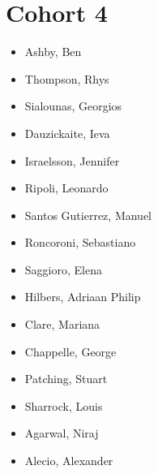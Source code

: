 \documentclass{article}
\begin{document}
\section*{Cohort 4}
\begin{itemize}
    \item Ashby, Ben \cite{ashby2021adaptive}
    \item Thompson, Rhys \cite{thompson2020accounting, thompsonpro, bloch2021constraining,bloch2021constraining}
    \item Sialounas, Georgios
    \item Dauzickaite, Ieva \cite{dauvzickaite2020spectral,dauvzickaite2021randomised,dauvzickaite2021time} %
    \item Israelsson, Jennifer \cite{israelsson2020spatial} %
    \item Ripoli, Leonardo
    \item Santos Gutierrez, Manuel \cite{gutierrez2020response,santos2021reduced,SantosGutierrez_2022} %
    \item Roncoroni, Sebastiano
    \item Saggioro, Elena \cite{saggioro2019quantifying, saggioro2020reconstructing,kretschmer2021quantifying} %
    \item Hilbers, Adriaan Philip \cite{hilbers2019importance, bloomfield2021importance, hilbers2020efficient} %
    \item Clare, Mariana \cite{clare2021hydro, clare2022assessing,clare2021combining,clare2022multi,clare2022calibration,clare2022bayesian,clare2022multilevel} %
    \item Chappelle, George \cite{chappelle2022occupancy} %
    \item Patching, Stuart \cite{patching2022divergence} %
    \item Sharrock, Louis \cite{sharrock2022joint} %
    \item Agarwal, Niraj \cite{ryzhov2020data, ryzhov2019data}
    \item Alecio, Alexander 
\end{itemize}
\end{document}
